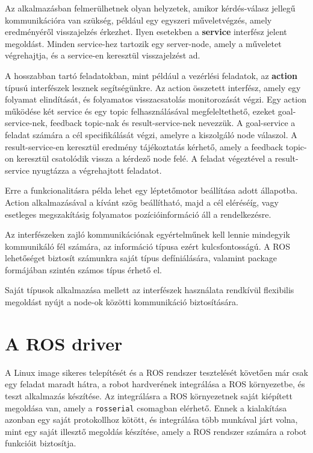 \medskip

Az alkalmazásban felmerülhetnek olyan helyzetek, amikor kérdés-válasz jellegű
kommunikációra van szükség, például egy egyszeri műveletvégzés, amely
eredményéről visszajelzés érkezhet. Ilyen esetekben a \textbf{service} interfész
jelent megoldást. Minden service-hez tartozik egy server-node, amely a műveletet
végrehajtja, és a service-en keresztül visszajelzést ad.

\medskip

A hosszabban tartó feladatokban, mint például a vezérlési feladatok, az
\textbf{action} típusú interfészek lesznek segítségünkre. Az action összetett
interfész, amely egy folyamat elindítását, és folyamatos visszacsatolás
monitorozását végzi. Egy action működése két service és egy topic
felhasználásával megfeleltethető, ezeket goal-service-nek, feedback topic-nak és
result-service-nek nevezzük. A goal-service a feladat számára a cél
specifikálását végzi, amelyre a kiszolgáló node válaszol. A result-service-en
keresztül eredmény tájékoztatás kérhető, amely a feedback topic-on keresztül
csatolódik vissza a kérdező node felé. A feladat végeztével a result-service
nyugtázza a végrehajtott feladatot.

Erre a funkcionalitásra példa lehet egy léptetőmotor beállítása adott
állapotba. Action alkalmazásával a kívánt szög beállítható, majd a cél eléréséíg,
vagy esetleges megszakításig folyamatos pozícióinformáció áll a rendelkezésre.

\medskip

Az interfészeken zajló kommunikációnak egyértelműnek kell lennie mindegyik
kommunikáló fél számára, az információ típusa ezért kulcsfontosságú. A ROS
lehetőséget biztosít számunkra saját típus defíniálására, valamint package
formájában szintén számos típus érhető el.

Saját típusok alkalmazása mellett az interfészek használata rendkívül flexibilis
megoldást nyújt a node-ok közötti kommunikáció biztosítására. 

\section{A ROS driver}

A Linux image sikeres telepítését és a ROS rendszer tesztelését követően már csak
egy feladat maradt hátra, a robot hardverének integrálása a ROS környezetbe, és
teszt alkalmazás készítése. Az integrálásra a ROS környezetnek saját kiépített
megoldása van, amely a \verb|rosserial| csomagban elérhető. Ennek a kialakítása
azonban egy saját protokollhoz kötött, és integrálása több munkával járt volna,
mint egy saját illesztő megoldás készítése, amely a ROS rendszer számára a robot
funkcióit biztosítja.

